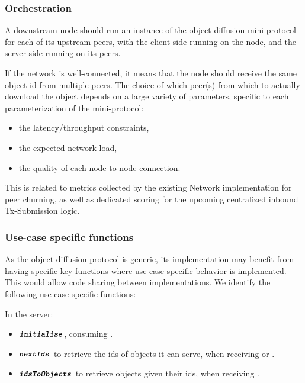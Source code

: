 \subsubsection{Orchestration}

A downstream node should run an instance of the object diffusion mini-protocol
for each of its upstream peers, with the client side running on the node, and
the server side running on its peers.

If the network is well-connected, it means that the node should receive the same object id
from multiple peers. The choice of which peer(s) from which to actually download the object
depends on a large variety of parameters, specific to each parameterization of the mini-protocol:
\begin{itemize}
  \item the latency/throughput constraints,
  \item the expected network load,
  \item the quality of each node-to-node connection.
\end{itemize}

This is related to metrics collected by the existing Network implementation for peer churning, as well as dedicated scoring for the upcoming centralized inbound Tx-Submission logic.

\subsubsection{Use-case specific functions}

As the object diffusion protocol is generic, its implementation may benefit from having specific key functions where use-case specific behavior is implemented.
This would allow code sharing between implementations.
We identify the following use-case specific functions:

In the server:
\begin{itemize}
  \item $\textbf{\texttt{\textit{initialise}}}$, consuming .
  \item $\textbf{\texttt{\textit{nextIds}}}$ to retrieve the ids of objects it can serve, when receiving \MsgRequestObjIdsB{} or \MsgRequestObjIdsNB{}.
  \item $\textbf{\texttt{\textit{idsToObjects}}}$ to retrieve objects given their ids, when receiving \MsgRequestObjs{}.
\end{itemize}

